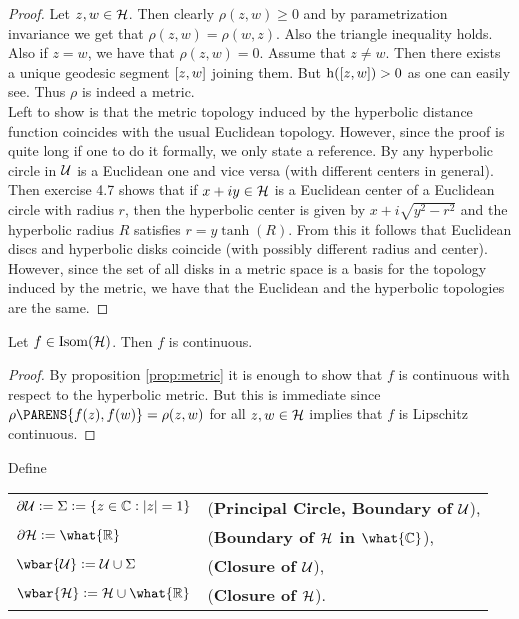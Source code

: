 \begin{proof}
Let $z,w \in \mathcal{H}$. Then clearly $\rho(z,w) \geq 0$ and by parametrization invariance we get that $\rho(z,w) = \rho(w,z)$. Also the triangle inequality holds. Also if $z = w$, we have that $\rho(z,w) = 0$. Assume that $z \neq w$. Then there exists a unique geodesic segment $\sbr[0]{z,w}$ joining them. But $\h(\sbr[0]{z,w}) > 0$ as one can easily see. Thus $\rho$ is indeed a metric.\\
Left to show is that the metric topology induced by the hyperbolic distance function coincides with the usual Euclidean topology. However, since the proof is quite long if one to do it formally, we only state a reference. By \cite[127]{anderson:hyperbolic_geometry:2005} any hyperbolic circle in $\mathcal{U}$ is a Euclidean one and vice versa (with different centers in general). Then exercise 4.7 \cite[129]{anderson:hyperbolic_geometry:2005} shows that if $x + iy \in \mathcal{H}$ is a Euclidean center of a Euclidean circle with radius $r$, then the hyperbolic center is given by $x + i \sqrt{y^2 - r^2}$ and the hyperbolic radius $R$ satisfies $r = y \tanh(R)$. From this it follows that Euclidean discs and hyperbolic disks coincide (with possibly different radius and center). However, since the set of all disks in a metric space is a basis for the topology induced by the metric, we have that the Euclidean and the hyperbolic topologies are the same.
\end{proof}

\begin{proposition}
Let $f \in \mathrm{Isom}(\mathcal{H})$. Then $f$ is continuous.
\label{prop:continuous}
\end{proposition}

\begin{proof}
By proposition \ref{prop:metric} it is enough to show that $f$ is continuous with respect to the hyperbolic metric. But this is immediate since $\rho\PARENS{f(z),f(w)} = \rho(z,w)$ for all $z,w \in \mathcal{H}$ implies that $f$ is Lipschitz continuous.
\end{proof}

\begin{definition}
	Define
		\begin{center}
		\begin{tabular}{ll}
			$\partial \Ucal := \Sigma := \cbr[0]{z \in \Cbb : \abs[0]{z} = 1}$ & (\textbf{Principal Circle, Boundary of $\mathcal{U}$}),\\
			$\partial \Hcal := \what{\Rbb}$ & (\textbf{Boundary of $\mathcal{H}$ in $\what{\Cbb}$}),\\
			$\wbar{\Ucal} := \Ucal \cup \Sigma$ & (\textbf{Closure of $\mathcal{U}$}),\\
			$\wbar{\Hcal} := \Hcal \cup \what{\Rbb}$ & (\textbf{Closure of $\mathcal{H}$}).\\
		\end{tabular}
	\end{center}
\end{definition}

